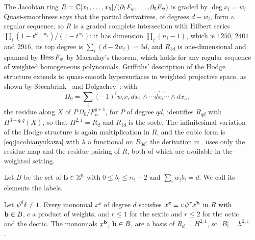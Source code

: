 The Jacobian ring $R=\mathbb{C}[x_1,\dots,x_5]/(\partial_1F_\psi,\dots,
\partial_5F_\psi)$ is graded by $\deg x_i=w_i$. Quasi-smoothness says that
the partial derivatives, of degrees $d-w_i$, form a regular sequence, so
$R$ is a graded complete intersection with Hilbert series
$\prod_i(1-t^{d-w_i})/(1-t^{w_i})$: it has dimension $\prod_i(n_i-1)$, which
is $1250$, $2401$ and $2916$, its top degree is $\sum_i(d-2w_i)=3d$, and
$R_{3d}$ is one-dimensional and spanned by $\operatorname{Hess} F_\psi$ by Macaulay's
theorem, which holds for any regular sequence of weighted homogeneous
polynomials. Griffiths' description of the Hodge structure extends to
quasi-smooth hypersurfaces in weighted projective space, as shown by
Steenbrink~\cite{Ste77} and Dolgachev~\cite{Dol82}: with
\[
\Omega_0=\sum_i(-1)^iw_ix_i\,dx_1\wedge\cdots\widehat{dx_i}\cdots\wedge dx_5,
\]
the residue along $X$ of $P\,\Omega_0/F_\psi^{q+1}$, for $P$ of degree
$qd$, identifies $R_{qd}$ with $H^{3-q,q}(X)$, so that $H^{2,1}=R_d$ and
$R_{3d}$ is the socle. The
infinitesimal variation of the Hodge structure is again multiplication in
$R$, and the cubic form is \eqref{eq:jacobianyukawa} with $\lambda$ a
functional on $R_{3d}$; the derivation in~\cite{CG80} uses only the residue
map and the residue pairing of $R$, both of which are available in the
weighted setting.

Let $B$ be the set of $\mathbf{b}\in\mathbb{Z}^5$ with $0\le b_i\le n_i-2$ and
$\sum_iw_ib_i=d$. We call its elements the labels.

\begin{lemma}\label{lem:wlabels}
Let $\psi^d\delta\ne1$. Every monomial $x^{\ee}$ of degree $d$ satisfies
$x^{\mathbf{e}}\equiv c\,\psi^r x^{\mathbf{b}}$ in $R$ with $\mathbf{b}\in B$, $c$ a product of
weights, and $r\le1$ for the sextic and $r\le2$ for the octic and the
dectic. The monomials $x^{\mathbf{b}}$, $\mathbf{b}\in B$, are a basis of $R_d=H^{2,1}$,
so $|B|=h^{2,1}$.
\end{lemma}

